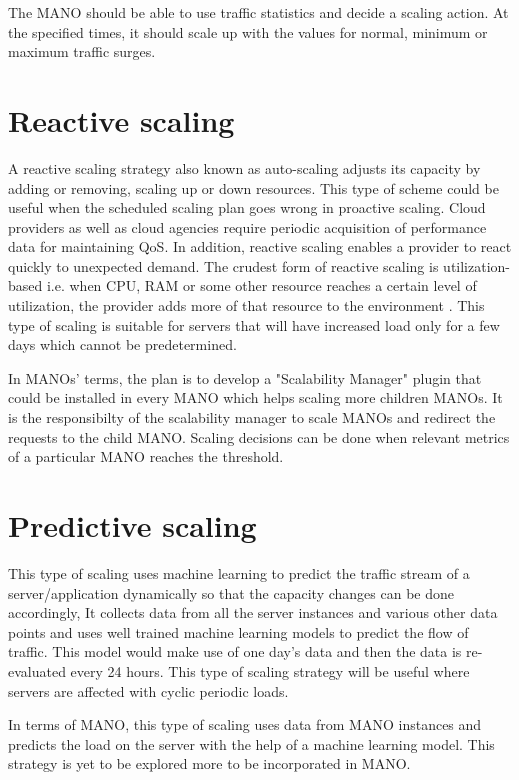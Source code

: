 The MANO should be able to use traffic statistics and decide a scaling action. At the specified times, it should scale up with the values for normal, minimum or maximum traffic surges.


\section{Reactive scaling}

A reactive scaling strategy also known as auto-scaling adjusts its capacity by adding or removing, scaling up or down resources.
This type of scheme could be useful when the scheduled scaling plan goes wrong in proactive scaling. Cloud providers as well as cloud agencies require periodic acquisition of performance data for maintaining QoS. In addition, reactive scaling enables a provider to react quickly to unexpected demand. The crudest form of reactive scaling is utilization-based i.e. when  CPU, RAM  or some other resource reaches a certain level of  utilization, the provider adds  more of that resource to the environment \cite{falatah_cloud_2014} \cite{reese_cloud_nodate}. This type of scaling is suitable for servers that will have increased load only for a few days which cannot be predetermined.

In MANOs' terms, the plan is to develop a "Scalability Manager" plugin that could be installed in every MANO which helps scaling more children MANOs. It is the responsibilty of the scalability manager to scale MANOs and redirect the requests to the child MANO. Scaling decisions can be done when relevant metrics of a particular MANO reaches the threshold.


\section{Predictive scaling}
This type of scaling uses machine learning to predict the traffic stream of a server/application dynamically so that the capacity changes can be done accordingly, It collects data from all the server instances and various other data points and uses well trained machine learning models to predict the flow of traffic. This model would make use of one day's data and then the data is re-evaluated every 24 hours. This type of scaling strategy will be useful where servers are affected with cyclic periodic loads.

In terms of MANO, this type of scaling uses data from MANO instances and predicts the load on the server with the help of a machine learning model. This strategy is yet to be explored more to be incorporated in MANO.

